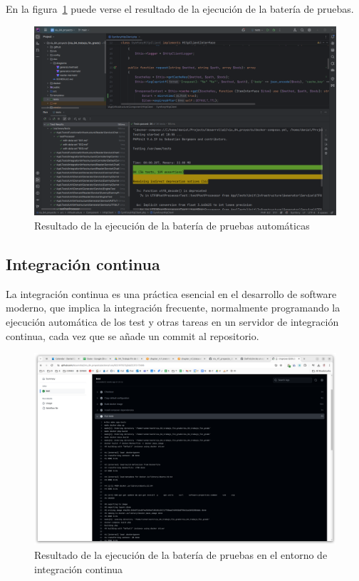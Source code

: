 En la figura~\ref{fig:chapter_4.5.test_suite_execution} puede verse el resultado de la ejecución de la batería de
pruebas.

\begin{figure}[ht]
    \begin{center}
        \includegraphics[width=\textwidth]{./chapter/4/images/chapter_4.5.test_suite_execution}
        \caption{Resultado de la ejecución de la batería de pruebas automáticas}
        \label{fig:chapter_4.5.test_suite_execution}
    \end{center}
\end{figure}

\subsection{Integración continua}
La integración continua es una práctica esencial en el desarrollo de software moderno, que implica la integración
frecuente, normalmente programando la ejecución automática de los test y otras tareas en un servidor de integración
continua, cada vez que se añade un commit al repositorio.

\begin{figure}[ht]
    \begin{center}
        \includegraphics[width=\textwidth]{./chapter/4/images/chapter_4.5.github_actions_execution}
        \caption{Resultado de la ejecución de la batería de pruebas en el entorno de integración continua}
        \label{fig:chapter_4.5.github_actions_execution}
    \end{center}
\end{figure}

